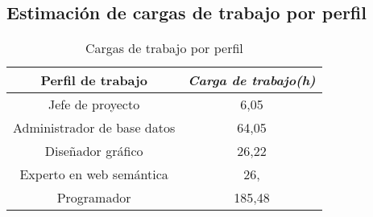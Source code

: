 \subsection{Estimación de cargas de trabajo por perfil}

\begin{table}[htp]
	\centering
	\caption{Cargas de trabajo por perfil}\label{tab:workload}
	\begin{tabular}{cc}
		\toprule
    	\textbf{Perfil de trabajo} & \emph{Carga de trabajo(h)}\\
    	\midrule
		Jefe de proyecto & 6,05\\
		Administrador de base datos & 64,05\\
		Diseñador gráfico & 26,22\\
		Experto en web semántica & 26,\\
		Programador & 185,48\\
    	\bottomrule
    \end{tabular}
\end{table}
